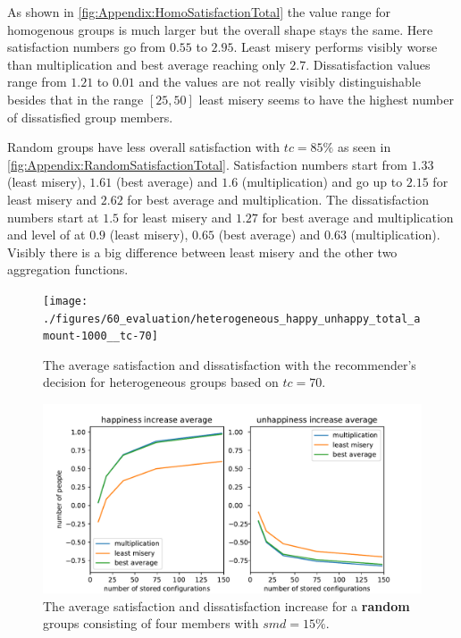 As shown in \autoref{fig:Appendix:HomoSatisfactionTotal} the value range for homogenous groups is much larger but the overall shape stays the same. Here satisfaction numbers go from $0.55$ to $2.95$. Least misery performs visibly worse than multiplication and best average reaching only $2.7$. Dissatisfaction values range from $1.21$ to $0.01$ and the values are not really visibly distinguishable besides that in the range $[25,50]$ least misery seems to have the highest number of dissatisfied group members.

Random groups have less overall satisfaction with $tc = 85\%$ as seen in \autoref{fig:Appendix:RandomSatisfactionTotal}. Satisfaction numbers start from $1.33$ (least misery), $1.61$ (best average) and $1.6$ (multiplication) and go up to $2.15$ for least misery and $2.62$ for best average and multiplication. The dissatisfaction numbers start at $1.5$ for least misery and $1.27$ for best average and multiplication and level of at $0.9$ (least misery), $0.65$ (best average) and $0.63$ (multiplication). Visibly there is a big difference between least misery and the other two aggregation functions.

\begin{figure}
    \centering
    \texttt{[image: ./figures/60\_evaluation/heterogeneous\_happy\_unhappy\_total\_amount-1000\_\_tc-70]}
    \caption{The average satisfaction and dissatisfaction with the recommender's decision for heterogeneous groups based on $tc = 70$.}
    \label{fig:Evaluation:HeteroSatisfactionTotal}
\end{figure}

\begin{figure}
    \centering
    \includegraphics[width=1\textwidth]{./figures/60_evaluation/random_happy_unhappy_increase_amount-1000_smd-15.pdf}
    \caption{The average satisfaction and dissatisfaction increase for a \textbf{random} groups consisting of four members with $smd=15\%$.}
    \label{fig:Evaluation:RandomGroupIncrease}
\end{figure}


